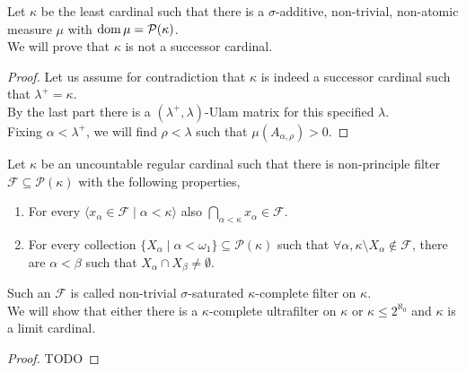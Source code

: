 \subquestion{}
Let $\kappa$ be the least cardinal such that there is a $\sigma$-additive, non-trivial, non-atomic measure $\mu$ with $\operatorname{dom} \mu = \mathcal{P}(\kappa)$. \\
We will prove that $\kappa$ is not a successor cardinal.
\begin{proof}
	Let us assume for contradiction that $\kappa$ is indeed a successor cardinal such that $\lambda^+ = \kappa$. \\
	By the last part there is a $(\lambda^+, \lambda)$-Ulam matrix for this specified $\lambda$. \\
	Fixing $\alpha < \lambda^+$, we will find $\rho < \lambda$ such that $\mu(A_{\alpha, \rho}) > 0$.
\end{proof}

\question{}
Let $\kappa$ be an uncountable regular cardinal such that there is non-principle filter $\mathcal{F} \subseteq \mathcal{P}(\kappa)$ with the following properties,
\begin{enumerate}
	\item For every $\langle x_\alpha \in \mathcal{F} \mid \alpha < \kappa \rangle$ also $\bigcap_{\alpha < \kappa} x_\alpha \in \mathcal{F}$.
	\item For every collection $\{ X_\alpha \mid \alpha < \omega_1 \} \subseteq \mathcal{P}(\kappa)$ such that $\forall \alpha, \kappa \setminus X_\alpha \notin \mathcal{F}$,
		there are $\alpha < \beta$ such that $X_\alpha \cap X_\beta \ne \emptyset$.
\end{enumerate}
Such an $\mathcal{F}$ is called non-trivial $\sigma$-saturated $\kappa$-complete filter on $\kappa$. \\
We will show that either there is a $\kappa$-complete ultrafilter on $\kappa$ or $\kappa \le 2^{\aleph_0}$ and $\kappa$ is a limit cardinal.
\begin{proof}
	TODO
\end{proof}


